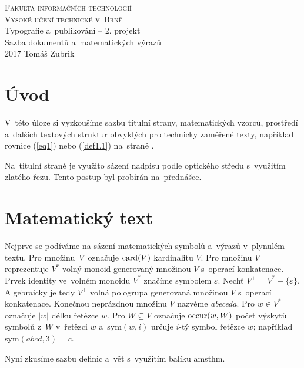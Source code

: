\documentclass[11pt, a4paper, twocolumn]{article}
\theoremstyle{definition}
\theoremstyle{plain}
\begin{document}
\begin{titlepage}
\begin{center}
\Huge
\textsc{Fakulta informačních technologií\\
	Vysoké učení technické v~Brně}\\
\LARGE{Typografie a~publikování -- 2. projekt\\
		Sazba dokumentů a~matematických výrazů}\\ 
{\Large 2017 \hfill Tomáš Zubrik} \newpage
\end{center}
\end{titlepage}

\section*{Úvod}
V~této úloze si vyzkoušíme sazbu titulní strany, matematických vzorců, prostředí a~dalších textových struktur obvyklých pro technicky zaměřené texty, například rovnice (\ref{eq1}) nebo (\ref{def1.1}) na~straně \pageref{def1.1}.

Na~titulní straně je využito sázení nadpisu podle optického středu s~využitím zlatého řezu. Tento postup byl probírán na~přednášce.

\section{Matematický text}
Nejprve se podíváme na sázení matematických symbolů a~výrazů v~plynulém textu. Pro množinu\ $V$\ označuje $\textnormal{card}(V)$ kardinalitu $V$.
Pro množinu $V$ reprezentuje $V^*$ volný monoid generovaný množinou $V$ s~operací kon\-ka\-te\-na\-ce.
Prvek identity ve~volném monoidu $V^*$ značíme symbolem $\varepsilon$.
Nechť $V^+=V^*-\{\varepsilon\}$. Algebraicky je tedy  $V^+$ volná pologrupa generovaná množinou $V$ s~operací konkatenace.
Konečnou neprázdnou množinu $V$ nazvěme \emph{abeceda}.
Pro $w \in V^*$ označuje $|w|$ délku řetězce $w$. Pro $W \subseteq V$ označuje $\textnormal{occur}(w,W)$ počet výskytů symbolů z~$W$ v~řetězci $w$ a~sym$(w,i)$ určuje $i$-tý symbol řetězce $w$; například sym$(abcd,3)=c$.

Nyní zkusíme sazbu definic a~vět s~využitím balíku amsthm.
\end{document}
